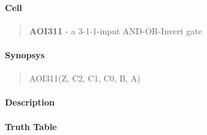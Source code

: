 \label{AOI311}
\paragraph{Cell}
\begin{quote}
    \textbf{AOI311} - a 3-1-1-input AND-OR-Invert gate
\end{quote}

\paragraph{Synopsys}
\begin{quote}
    AOI311(Z, C2, C1, C0, B, A)
\end{quote}

\paragraph{Description}

%

\paragraph{Truth Table}


